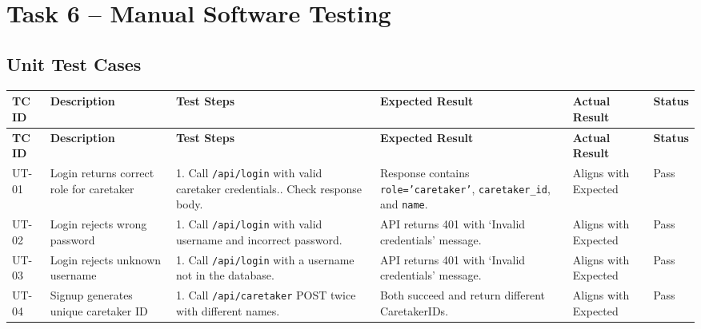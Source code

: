 \documentclass[12pt,a4paper]{article}
\begin{document}
\section{Task 6 -- Manual Software Testing}


\scriptsize
\setlength{\LTleft}{0pt}
\setlength{\LTright}{0pt}

\subsection{Unit Test Cases}
 
\begin{longtable}{|p{1cm}|p{2.5cm}|p{3.5cm}|p{3.5cm}|p{2cm}|p{1.2cm}|}
    \hline
    \textbf{TC ID} & \textbf{Description} & \textbf{Test Steps} & \textbf{Expected Result} & \textbf{Actual Result} & \textbf{Status} \\
    \hline
    \endfirsthead
    \hline
    \textbf{TC ID} & \textbf{Description} & \textbf{Test Steps} & \textbf{Expected Result} & \textbf{Actual Result} & \textbf{Status} \\
    \hline
    \endhead
 
    UT-01 & Login returns correct role for caretaker &
        1. Call \texttt{/api/login} with valid caretaker credentials.\newline
        2. Check response body. &
        Response contains \texttt{role='caretaker'}, \texttt{caretaker\_id}, and \texttt{name}. &
        Aligns with Expected & Pass \\
    \hline
 
    UT-02 & Login rejects wrong password &
        1. Call \texttt{/api/login} with valid username and incorrect password. &
        API returns 401 with `Invalid credentials' message. &
        Aligns with Expected & Pass \\
    \hline
 
    UT-03 & Login rejects unknown username &
        1. Call \texttt{/api/login} with a username not in the database. &
        API returns 401 with `Invalid credentials' message. &
        Aligns with Expected & Pass \\
    \hline
 
    UT-04 & Signup generates unique caretaker ID &
        1. Call \texttt{/api/caretaker} POST twice with different names. &
        Both succeed and return different CaretakerIDs. &
        Aligns with Expected & Pass \\
    \hline
 

\end{longtable}
\end{document}
